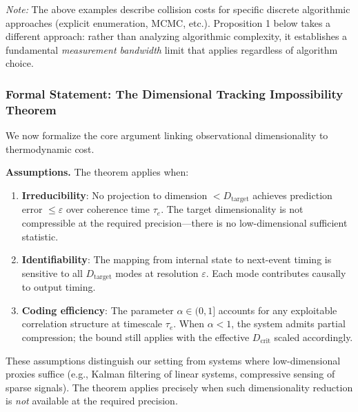 \documentclass[12pt]{article}
\begin{document}
\textit{Note:} The above examples describe collision costs for specific discrete algorithmic approaches (explicit enumeration, MCMC, etc.). Proposition 1 below takes a different approach: rather than analyzing algorithmic complexity, it establishes a fundamental \textit{measurement bandwidth} limit that applies regardless of algorithm choice.

\subsubsection{Formal Statement: The Dimensional Tracking Impossibility Theorem}

We now formalize the core argument linking observational dimensionality to thermodynamic cost.

\textbf{Assumptions.} The theorem applies when:
\begin{enumerate}
\item \textbf{Irreducibility}: No projection to dimension $< D_{\text{target}}$ achieves prediction error $\le \varepsilon$ over coherence time $\tau_e$. The target dimensionality is not compressible at the required precision---there is no low-dimensional sufficient statistic.
\item \textbf{Identifiability}: The mapping from internal state to next-event timing is sensitive to all $D_{\text{target}}$ modes at resolution $\varepsilon$. Each mode contributes causally to output timing.
\item \textbf{Coding efficiency}: The parameter $\alpha \in (0,1]$ accounts for any exploitable correlation structure at timescale $\tau_e$. When $\alpha < 1$, the system admits partial compression; the bound still applies with the effective $D_{\text{crit}}$ scaled accordingly.
\end{enumerate}
These assumptions distinguish our setting from systems where low-dimensional proxies suffice (e.g., Kalman filtering of linear systems, compressive sensing of sparse signals). The theorem applies precisely when such dimensionality reduction is \textit{not} available at the required precision.
\end{document}
